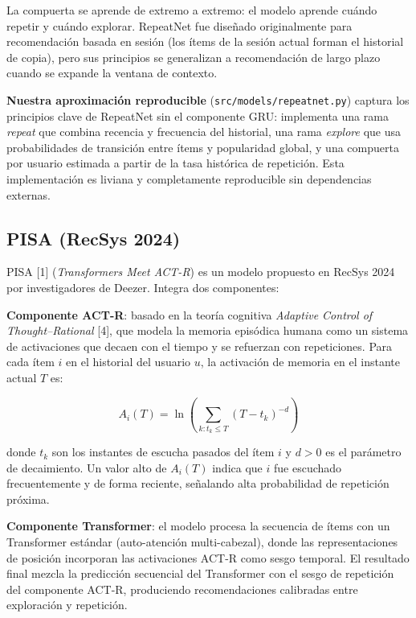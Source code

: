 \documentclass{article}
\begin{document}
La compuerta se aprende de extremo a extremo: el modelo aprende cuándo repetir y cuándo explorar. RepeatNet fue diseñado originalmente para recomendación basada en sesión (los ítems de la sesión actual forman el historial de copia), pero sus principios se generalizan a recomendación de largo plazo cuando se expande la ventana de contexto.

\textbf{Nuestra aproximación reproducible} (\texttt{src/models/repeatnet.py}) captura los principios clave de RepeatNet sin el componente GRU: implementa una rama \emph{repeat} que combina recencia y frecuencia del historial, una rama \emph{explore} que usa probabilidades de transición entre ítems y popularidad global, y una compuerta por usuario estimada a partir de la tasa histórica de repetición. Esta implementación es liviana y completamente reproducible sin dependencias externas.

\subsection{PISA (RecSys 2024)}\label{pisa-recsys-2024}

PISA {[}1{]} (\emph{Transformers Meet ACT-R}) es un modelo propuesto en RecSys 2024 por investigadores de Deezer. Integra dos componentes:

\textbf{Componente ACT-R}: basado en la teoría cognitiva \emph{Adaptive Control of Thought--Rational} {[}4{]}, que modela la memoria episódica humana como un sistema de activaciones que decaen con el tiempo y se refuerzan con repeticiones. Para cada ítem \(i\) en el historial del usuario \(u\), la activación de memoria en el instante actual \(T\) es:

\[
A_i(T) = \ln \!\left(\sum_{k : t_k \leq T} (T - t_k)^{-d}\right)
\]

donde \(t_k\) son los instantes de escucha pasados del ítem \(i\) y \(d > 0\) es el parámetro de decaimiento. Un valor alto de \(A_i(T)\) indica que \(i\) fue escuchado frecuentemente y de forma reciente, señalando alta probabilidad de repetición próxima.

\textbf{Componente Transformer}: el modelo procesa la secuencia de ítems con un Transformer estándar (auto-atención multi-cabezal), donde las representaciones de posición incorporan las activaciones ACT-R como sesgo temporal. El resultado final mezcla la predicción secuencial del Transformer con el sesgo de repetición del componente ACT-R, produciendo recomendaciones calibradas entre exploración y repetición.
\end{document}
